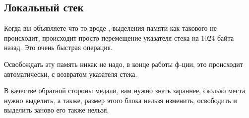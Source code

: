 ﻿\subsection{Локальный стек}

Когда вы объявляете что-то вроде , выделения памяти как такового не происходит, происходит
просто перемещение указателя стека на 1024 байта назад\cite[1.2.3]{REBook}. Это очень быстрая операция.

Освобождать эту память никак не надо, в конце работы ф-ции, это происходит автоматически, с возвратом указателя стека.

В качестве обратной стороны медали, вам нужно знать зараннее, сколько места нужно выделить, а также, размер
этого блока нельзя изменить, освободить и выделить заново его также нельзя.
